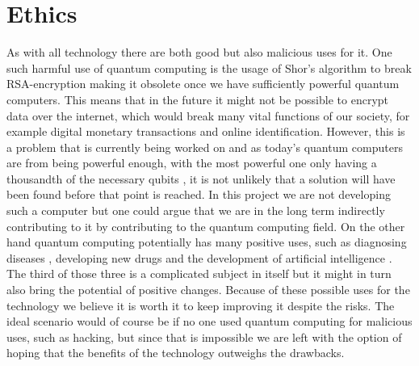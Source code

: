\section{Ethics}

As with all technology there are both good but also malicious uses for it.
One such harmful use of quantum computing is the usage of Shor's algorithm to break RSA-encryption making it obsolete once we have sufficiently powerful quantum computers.
This means that in the future it might not be possible to encrypt data over the internet, which would break many vital functions of our society, for example digital monetary transactions and online identification.
However, this is a problem that is currently being worked on \cite{NIST} and as today's quantum computers are from being powerful enough, with the most powerful one only having a thousandth of the necessary qubits \cite{Forbes}, it is not unlikely that a solution will have been found before that point is reached.
In this project we are not developing such a computer but one could argue that we are in the long term indirectly contributing to it by contributing to the quantum computing field.
On the other hand quantum computing potentially has many positive uses, such as diagnosing diseases \cite{quantum-medicine-diagnosis}, developing new drugs \cite{quantum-medicine-drugs} and the development of artificial intelligence \cite{quantum-ai}.
The third of those three is a complicated subject in itself but it might in turn also bring the potential of positive changes.
Because of these possible uses for the technology we believe it is worth it to keep improving it despite the risks.
The ideal scenario would of course be if no one used quantum computing for malicious uses, such as hacking, but since that is impossible we are left with the option of hoping that the benefits of the technology outweighs the drawbacks.